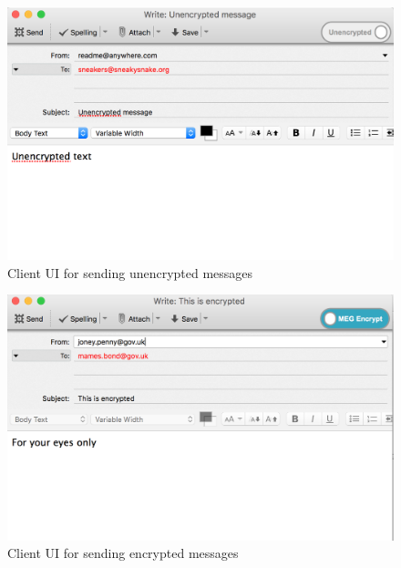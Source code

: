 \documentclass[11pt]{article}
\begin{document}
\begin{figure}[h]
    \centering
    \includegraphics[scale=.5]{unencrypted-client-ui.png}
    \caption{Client UI for sending unencrypted messages}
    \label{fig:unencrypted-ui}
\end{figure}
\begin{figure}[h]
    \centering
    \includegraphics[scale=.5]{encrypted-client-ui.png}
    \caption{Client UI for sending encrypted messages}
    \label{fig:encrypted-ui}
\end{figure}
\end{document}
